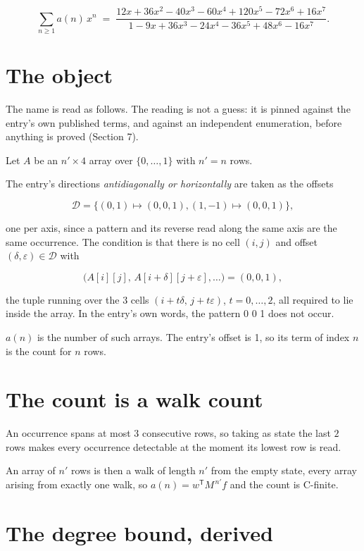 \documentclass[11pt]{article}
\theoremstyle{definition}
\begin{document}
\[\sum_{n \ge 1} a(n)\,x^n \;=\; \frac{12x + 36x^{2} - 40x^{3} - 60x^{4} + 120x^{5} - 72x^{6} + 16x^{7}}{1 - 9x + 36x^{3} - 24x^{4} - 36x^{5} + 48x^{6} - 16x^{7}}.\]

\section{The object}

The name is read as follows. The reading is not a guess: it is pinned against the entry's own published terms, and against an independent enumeration, before anything is proved (Section 7).

Let $A$ be an $n' \times 4$ array over $\{0,\dots,1\}$ with $n' = n$ rows.

The entry's directions {\itshape antidiagonally or horizontally} are taken as the offsets

\[\mathcal{D} = \{(0,1)\mapsto(0,0,1), (1,-1)\mapsto(0,0,1)\},\]

one per axis, since a pattern and its reverse read along the same axis are the same occurrence. The condition is that there is no cell $(i,j)$ and offset $(\delta,\varepsilon)\in\mathcal{D}$ with

\[\bigl(A[i][j],\,A[i{+}\delta][j{+}\varepsilon],\dots\bigr) = (0, 0, 1),\]

the tuple running over the $3$ cells $(i+t\delta,\,j+t\varepsilon)$, $t = 0,\dots,2$, all required to lie inside the array. In the entry's own words, the pattern 0 0 1 does not occur.

$a(n)$ is the number of such arrays. The entry's offset is 1, so its term of index $n$ is the count for $n$ rows.

\section{The count is a walk count}

An occurrence spans at most $3$ consecutive rows, so taking as state the last $2$ rows makes every occurrence detectable at the moment its lowest row is read.

An array of $n'$ rows is then a walk of length $n'$ from the empty state, every array arising from exactly one walk, so $a(n) = w^{\mathsf T}M^{\,n'}f$ and the count is C-finite.

\section{The degree bound, derived}
\end{document}
